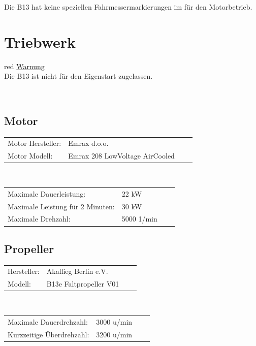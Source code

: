 \vspace{0.2cm}
Die B13 hat keine speziellen Fahrmessermarkierungen im für den Motorbetrieb.
\newpage
\section{Triebwerk}
\begin{color}{red}
\large{\underline{Warnung}}\\
Die B13 ist nicht für den Eigenstart zugelassen.
\end{color}\\

\subsection{Motor}
\begin{tabular}{p{}p{}ll}
Motor Hersteller: & Emrax d.o.o.\\
Motor Modell: & Emrax 208 LowVoltage AirCooled\\
\end{tabular}\\

\vspace{0.2cm}
\begin{tabular}{p{}p{}ll}
Maximale Dauerleistung: & 22 kW\\
Maximale Leistung für 2 Minuten: & 30 kW\\
Maximale Drehzahl: & 5000 1/min\\
\end{tabular}

\subsection{Propeller}
\begin{tabular}{p{}p{}ll}
Hersteller: & Akaflieg Berlin e.V. \\
Modell: & B13e Faltpropeller V01 \\
\end{tabular}\\

\vspace{0.2cm}
\begin{tabular}{p{}p{}ll}
Maximale Dauerdrehzahl: & 3000 u/min \\
Kurzzeitige Überdrehzahl: & 3200 u/min \\
\end{tabular}

